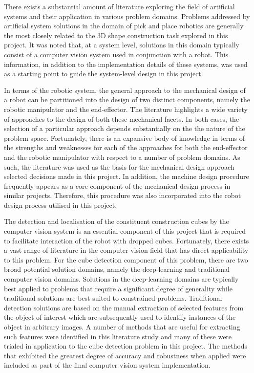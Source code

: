 There exists a substantial amount of literature exploring the field of artificial systems and their application in various problem domains. Problems addressed by artificial system solutions in the domain of pick and place robotics are generally the most closely related to the 3D shape construction task explored in this project. It was noted that, at a system level, solutions in this domain typically consist of a computer vision system used in conjunction with a robot. This information, in addition to the implementation details of these systems, was used as a starting point to guide the system-level design in this project.

In terms of the robotic system, the general approach to the mechanical design of a robot can be partitioned into the design of two distinct components, namely the robotic manipulator and the end-effector. The literature highlights a wide variety of approaches to the design of both these mechanical facets. In both cases, the selection of a particular approach depends substantially on the the nature of the problem space. Fortunately, there is an expansive body of knowledge in terms of the strengths and weaknesses for each of the approaches for both the end-effector and the robotic manipulator with respect to a number of problem domains. As such, the literature was used as the basis for the mechanical design approach selected decisions made in this project. In addition, the machine design procedure frequently appears as a core component of the mechanical design process in similar projects. Therefore, this procedure was also incorporated into the robot design process utilised in this project.

The detection and localisation of the constituent construction cubes by the computer vision system is an essential component of this project that is required to facilitate interaction of the robot with dropped cubes. Fortunately, there exists a vast range of literature in the computer vision field that has direct applicability to this problem. For the cube detection component of this problem, there are two broad potential solution domains, namely the deep-learning and traditional computer vision domains. Solutions in the deep-learning domains are typically best applied to problems that require a significant degree of generality while traditional solutions are best suited to constrained problems. Traditional detection solutions are based on the manual extraction of selected features from the object of interest which are subsequently used to identify instances of the object in arbitrary images. A number of methods that are useful for extracting such features were identified in this literature study and many of these were trialed in application to the cube detection problem in this project. The methods that exhibited the greatest degree of accuracy and robustness when applied were included as part of the final computer vision system implementation.

